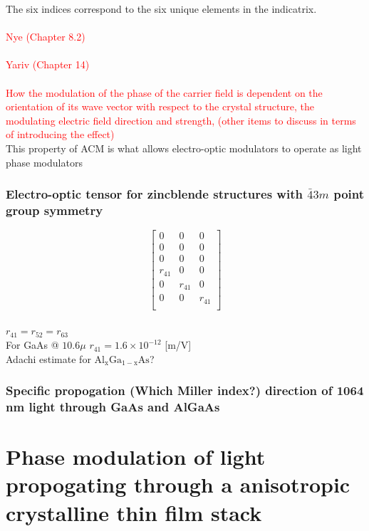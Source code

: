 The six indices correspond to the six unique elements in the indicatrix.
\\
\\
\textcolor{red}{Nye (Chapter 8.2)}
\\
\\
\textcolor{red}{Yariv (Chapter 14)}
\\
\\
\textcolor{red}{ How the modulation of the phase of the carrier field is dependent on the orientation of its wave vector with respect to the crystal structure, the modulating electric field direction and strength, (other items to discuss in terms of introducing the effect)}
\\
This property of ACM is what allows electro-optic modulators to operate as light phase modulators

\subsubsection{Electro-optic tensor for zincblende structures with $\bar{4}3m$ point group symmetry}
\begin{equation}
 \left[ {\begin{array}{ccc}
   0 & 0 & 0\\
   0 & 0 & 0\\
   0 & 0 & 0\\
   r_{41} & 0 & 0\\
   0 & r_{41} & 0\\
   0 & 0 & r_{41}\\
  \end{array} } \right]
\end{equation}
\\
$r_{41} = r_{52} = r_{63}$
\\
For GaAs @ $10.6\mu$ $r_{41} = 1.6 \times 10^{-12}$ [m/V]
\\
Adachi estimate for $\mathrm{Al_{x}Ga_{1-x}As}$?


\subsubsection{Specific propogation (Which Miller index?) direction of 1064 nm light through GaAs and AlGaAs}



\section{Phase modulation of light propogating through a anisotropic crystalline thin film stack}

